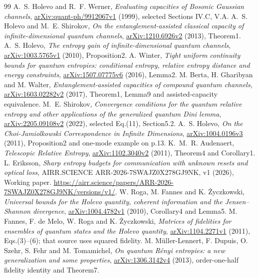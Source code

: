 \documentclass[11pt]{article}
\begin{document}
\begin{thebibliography}{99}\small
{} A.~S. Holevo and R.~F. Werner,
\emph{Evaluating capacities of Bosonic Gaussian channels},
\href{https://arxiv.org/abs/quant-ph/9912067v1}
{arXiv:quant-ph/9912067v1} (1999), selected Sections IV.C, V.A.
 A.~S. Holevo and M.~E. Shirokov,
\emph{On the entanglement-assisted classical capacity of
infinite-dimensional quantum channels},
\href{https://arxiv.org/abs/1210.6926v2}{arXiv:1210.6926v2}
(2013), Theorem1.
 A.~S. Holevo,
\emph{The entropy gain of infinite-dimensional quantum channels},
\href{https://arxiv.org/abs/1003.5765v1}{arXiv:1003.5765v1}
(2010), Proposition2.
 A. Winter,
\emph{Tight uniform continuity bounds for quantum entropies:
conditional entropy, relative entropy distance and energy constraints},
\href{https://arxiv.org/abs/1507.07775v6}{arXiv:1507.07775v6}
(2016), Lemma2.
 M. Berta, H. Gharibyan and M. Walter,
\emph{Entanglement-assisted capacities of compound quantum channels},
\href{https://arxiv.org/abs/1603.02282v2}{arXiv:1603.02282v2}
(2017), Theorem1, Lemma9 and assisted-capacity equivalence.
 M.~E. Shirokov,
\emph{Convergence conditions for the quantum relative entropy and other
applications of the generalized quantum Dini lemma},
\href{https://arxiv.org/abs/2205.09108v2}{arXiv:2205.09108v2}
(2022), selected Eq.(11), Section5.2.
 A.~S. Holevo,
\emph{On the Choi-Jamiolkowski Correspondence in Infinite Dimensions},
\href{https://arxiv.org/abs/1004.0196v3}{arXiv:1004.0196v3}
(2011), Proposition2 and one-mode example on p.13.
 K.~M.~R. Audenaert,
\emph{Telescopic Relative Entropy},
\href{https://arxiv.org/abs/1102.3040v2}{arXiv:1102.3040v2}
(2011), Theorem4 and Corollary1.
 L. Eriksson,
\emph{Sharp entropy budgets for communication with unknown resets and
optical loss}, AIRR.SCIENCE ARR-2026-7SWAJZ0X278GJ9NK, v1
(2026), Working paper.
\url{https://airr.science/papers/ARR-2026-7SWAJZ0X278GJ9NK/versions/v1/}.
 W. Roga, M. Fannes and K. \.{Z}yczkowski,
\emph{Universal bounds for the Holevo quantity, coherent information
and the Jensen--Shannon divergence},
\href{https://arxiv.org/abs/1004.4782v1}{arXiv:1004.4782v1}
(2010), Corollary4 and Lemma5.
 M. Fannes, F. de Melo, W. Roga and K. \.{Z}yczkowski,
\emph{Matrices of fidelities for ensembles of quantum states and
the Holevo quantity},
\href{https://arxiv.org/abs/1104.2271v1}{arXiv:1104.2271v1}
(2011), Eqs.(3)--(6); that source uses squared fidelity.
 M. M\"uller-Lennert, F. Dupuis, O. Szehr,
S. Fehr and M. Tomamichel,
\emph{On quantum R\'enyi entropies: a new generalization and some
properties},
\href{https://arxiv.org/abs/1306.3142v4}{arXiv:1306.3142v4}
(2013), order-one-half fidelity identity and Theorem7.
\end{thebibliography}
\end{document}
